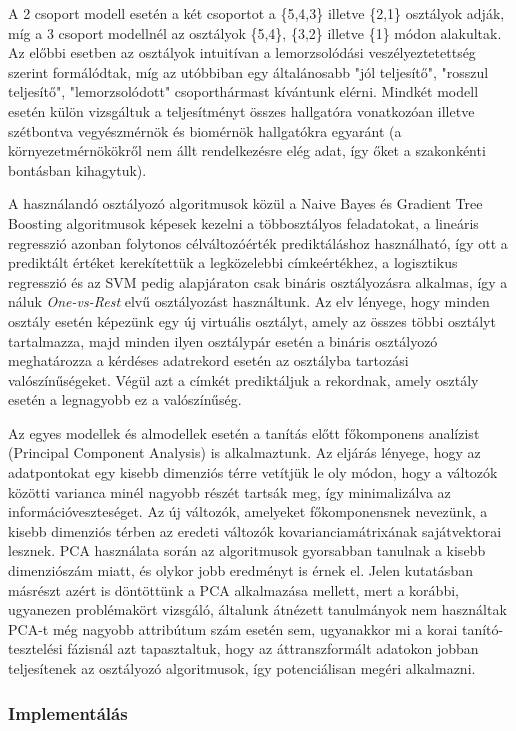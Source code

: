 \documentclass[12pt]{article}
\begin{document}
A 2 csoport modell esetén a két csoportot a \{5,4,3\} illetve \{2,1\} osztályok adják, míg a 3 csoport modellnél az osztályok \{5,4\}, \{3,2\} illetve \{1\} módon alakultak. Az előbbi esetben az osztályok intuitívan a lemorzsolódási veszélyeztetettség szerint formálódtak, míg az utóbbiban egy általánosabb "jól teljesítő", "rosszul teljesítő", "lemorzsolódott" csoporthármast kívántunk elérni. Mindkét modell esetén külön vizsgáltuk a teljesítményt összes hallgatóra vonatkozóan illetve szétbontva vegyészmérnök és biomérnök hallgatókra egyaránt (a környezetmérnökökről nem állt rendelkezésre elég adat, így őket a szakonkénti bontásban kihagytuk).

A használandó osztályozó algoritmusok közül a Naive Bayes és Gradient Tree Boosting algoritmusok képesek kezelni a többosztályos feladatokat, a lineáris regresszió azonban folytonos célváltozóérték prediktáláshoz használható, így ott a prediktált értéket kerekítettük a legközelebbi címkeértékhez, a logisztikus regresszió és az SVM pedig alapjáraton csak bináris osztályozásra alkalmas, így a náluk \textit{One-vs-Rest} elvű osztályozást használtunk. Az elv lényege, hogy minden osztály esetén képezünk egy új virtuális osztályt, amely az összes többi osztályt tartalmazza, majd minden ilyen osztálypár esetén a bináris osztályozó meghatározza a kérdéses adatrekord esetén az osztályba tartozási valószínűségeket. Végül azt a címkét prediktáljuk a rekordnak, amely osztály esetén a legnagyobb ez a valószínűség. 

Az egyes modellek és almodellek esetén a tanítás előtt főkomponens analízist (Principal Component Analysis) is alkalmaztunk. Az eljárás lényege, hogy az adatpontokat egy kisebb dimenziós térre vetítjük le oly módon, hogy a változók közötti varianca minél nagyobb részét tartsák meg, így minimalizálva az információveszteséget. Az új változók, amelyeket főkomponensnek nevezünk, a kisebb dimenziós térben az eredeti változók kovarianciamátrixának sajátvektorai lesznek. PCA használata során az algoritmusok gyorsabban tanulnak a kisebb dimenziószám miatt, és olykor jobb eredményt is érnek el. Jelen kutatásban másrészt azért is döntöttünk a PCA alkalmazása mellett, mert a korábbi, ugyanezen problémakört vizsgáló, általunk átnézett tanulmányok nem használtak PCA-t még nagyobb attribútum szám esetén sem, ugyanakkor mi a korai tanító-tesztelési fázisnál azt tapasztaltuk, hogy az áttranszformált adatokon jobban teljesítenek az osztályozó algoritmusok, így potenciálisan megéri alkalmazni.

\subsubsection*{Implementálás}
\end{document}
